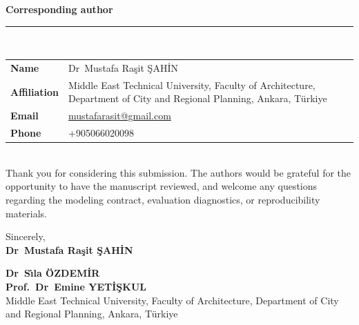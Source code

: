 \documentclass[11pt]{article}
\makeatletter
\newcommand{\AuthorA}{Dr\ Mustafa Ra\c{s}it \c{S}AH\.{I}N}
\newcommand{\AuthorB}{Dr\ S\.{\i}la \"OZDEM\.{I}R}
\newcommand{\AuthorC}{Prof.\ Dr\ Emine YET\.{I}\c{S}KUL}
\newcommand{\AffilOne}{Middle East Technical University, Faculty of Architecture, Department of City and Regional Planning, Ankara, T\"urkiye}
\newcommand{\CorrName}{\AuthorA}
\newcommand{\CorrEmail}{\href{mailto:mustafarasit@gmail.com}{mustafarasit@gmail.com}}
\newcommand{\CorrPhone}{+905066020098}
\newif\ifAnonymous
\newcommand{\SubRule}{{\color{black!65}\rule{\linewidth}{0.4pt}}}
\newcommand{\SmallHeading}[1]{\needspace{5\baselineskip}\vspace{0.85em}\noindent\textbf{#1}\\[-0.25em]\SubRule\\[0.45em]}
\makeatother
\begin{document}
\SmallHeading{Corresponding author}
\ifAnonymous
\noindent Contact details are recorded in the submission system and are withheld from this version in accordance with the journal's double-blind review policy.
\else
\noindent\begin{tabularx}{\linewidth}{@{}>{\bfseries}l X@{}}
Name & \CorrName\\
Affiliation & \AffilOne\\
Email & \CorrEmail\\
Phone & \CorrPhone\\
\end{tabularx}
\fi
\\[0.6em]

\noindent Thank you for considering this submission. The authors would be grateful for the opportunity to have the manuscript reviewed, and welcome any questions regarding the modeling contract, evaluation diagnostics, or reproducibility materials.

\vspace{0.7em}
\noindent Sincerely,\\[0.5em]
\noindent \ifAnonymous\textbf{On behalf of all authors}\else\textbf{\AuthorA}\fi
\ifAnonymous
\noindent \emph{Corresponding author; contact details in the submission system}
\else
\textbf{\AuthorB}\\
\textbf{\AuthorC}\\
\AffilOne
\fi

\endgroup
\end{document}
